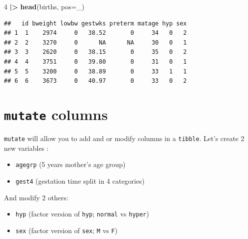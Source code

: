 \documentclass[
]{book}
\newenvironment{Shaded}{\begin{snugshade}}{\end{snugshade}}
\newcommand{\AttributeTok}[1]{\textcolor[rgb]{0.13,0.29,0.53}{#1}}
\newcommand{\DecValTok}[1]{\textcolor[rgb]{0.00,0.00,0.81}{#1}}
\newcommand{\FunctionTok}[1]{\textcolor[rgb]{0.13,0.29,0.53}{\textbf{#1}}}
\newcommand{\NormalTok}[1]{#1}
\newcommand{\SpecialCharTok}[1]{\textcolor[rgb]{0.81,0.36,0.00}{\textbf{#1}}}
\providecommand{\tightlist}{%
  \setlength{\itemsep}{0pt}\setlength{\parskip}{0pt}}
\begin{document}
\begin{Shaded}
\begin{Highlighting}[]
\DecValTok{4} \SpecialCharTok{|\textgreater{}} \FunctionTok{head}\NormalTok{(births, }\AttributeTok{pos=}\NormalTok{\_)}
\end{Highlighting}
\end{Shaded}

\begin{verbatim}
##   id bweight lowbw gestwks preterm matage hyp sex
## 1  1    2974     0   38.52       0     34   0   2
## 2  2    3270     0      NA      NA     30   0   1
## 3  3    2620     0   38.15       0     35   0   2
## 4  4    3751     0   39.80       0     31   0   1
## 5  5    3200     0   38.89       0     33   1   1
## 6  6    3673     0   40.97       0     33   0   2
\end{verbatim}

\section{\texorpdfstring{\texttt{mutate} columns}{mutate columns}}\label{mutate-columns}

\texttt{mutate} will allow you to add and or modify columns in a \texttt{tibble}.
Let's create 2 new variables :

\begin{itemize}
\tightlist
\item
  \texttt{agegrp} (5 years mother's age group)
\item
  \texttt{gest4} (gestation time split in 4 categories)
\end{itemize}

And modify 2 others:

\begin{itemize}
\tightlist
\item
  \texttt{hyp} (factor version of \texttt{hyp}; \texttt{normal} vs \texttt{hyper})
\item
  \texttt{sex} (factor version of \texttt{sex}; \texttt{M} vs \texttt{F})
\end{itemize}
\end{document}
